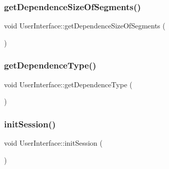 \hypertarget{class_user_interface_aaac8a635efdb79276275f9d1ea265cd7}{}\label{class_user_interface_aaac8a635efdb79276275f9d1ea265cd7} 
\subsubsection{\texorpdfstring{get\+Dependence\+Size\+Of\+Segments()}{getDependenceSizeOfSegments()}}
{\footnotesize\ttfamily void User\+Interface\+::get\+Dependence\+Size\+Of\+Segments (\begin{DoxyParamCaption}{ }\end{DoxyParamCaption})\hspace{0.3cm}{\ttfamily [private]}}

\hypertarget{class_user_interface_ab726cdce7e7518aae70cf42594139589}{}\label{class_user_interface_ab726cdce7e7518aae70cf42594139589} 
\subsubsection{\texorpdfstring{get\+Dependence\+Type()}{getDependenceType()}}
{\footnotesize\ttfamily void User\+Interface\+::get\+Dependence\+Type (\begin{DoxyParamCaption}{ }\end{DoxyParamCaption})\hspace{0.3cm}{\ttfamily [private]}}

\hypertarget{class_user_interface_a6c7f9ef9faa40eaf4760d57e89228786}{}\label{class_user_interface_a6c7f9ef9faa40eaf4760d57e89228786} 
\subsubsection{\texorpdfstring{init\+Session()}{initSession()}}
{\footnotesize\ttfamily void User\+Interface\+::init\+Session (\begin{DoxyParamCaption}{ }\end{DoxyParamCaption})}

\hypertarget{class_user_interface_a595a469d83a351719c75c65fbf4a6fbe}{}\label{class_user_interface_a595a469d83a351719c75c65fbf4a6fbe} 
